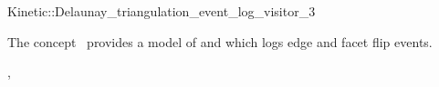

\begin{ccRefClass}{Kinetic::Delaunay_triangulation_event_log_visitor_3}


\ccDefinition
  
The concept \ccRefName\ provides a model of
 and  which logs edge and facet flip events.

\ccIsModel

, 

\ccSeeAlso



\end{ccRefClass}


